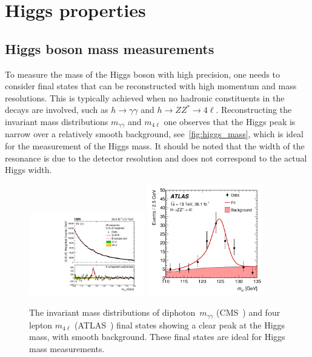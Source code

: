 \section{Higgs properties \label{sec:Higgsprop} }
\subsection{Higgs boson mass measurements}
To measure the mass of the Higgs boson with high precision, one needs to consider final states that can be reconstructed with high momentum and mass resolutions. This is typically achieved when no hadronic constituents in the decays are involved, such as  $ h \to \gamma \gamma$ and $ h \to Z Z^*\to 4 \ell$. Reconstructing the invariant mass distributions $m_{\gamma \gamma}$ and $m_{4\ell}$ one observes that the Higgs peak is narrow over a relatively smooth background, see~\autoref{fig:higgs_mass}, which is ideal for the measurement of the Higgs mass. It should be noted that the width of the resonance is due to the detector resolution and does not correspond to the actual Higgs width.\\
\begin{figure}[t!]
	\begin{center}
		\includegraphics[width=0.45\textwidth]{figures/Higgs_results/CMS-HIG-19-004_Figure_005-b}
		\includegraphics[width=0.45\textwidth]{figures/Higgs_results/dataAll_H4l_m4l_pdf_constrained} 
		\caption{The invariant mass distributions of diphoton~$m_{\gamma \gamma}$ (CMS~\cite{CMS:2020xrn}) and four lepton $m_{4 \ell}$ (ATLAS~\cite{ATLAS:2018tdk}) final states showing a clear peak at the Higgs mass, with smooth background. These final states are ideal for Higgs mass measurements. \label{fig:higgs_mass} }
	\end{center}
\end{figure}
